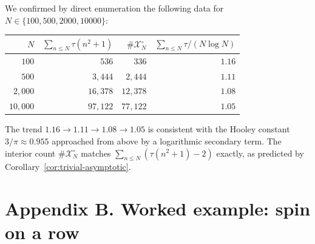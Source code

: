 \documentclass[11pt]{article}
\theoremstyle{definition}
\begin{document}
We confirmed by direct enumeration the following data for $N\in\{100,
500,2000,10000\}$:

\medskip

\begin{center}
\begin{tabular}{r|rrr}
$N$ & $\sum_{n\le N}\tau(n^{2}+1)$ & $\#\mathcal{X}_{N}^{\circ}$ &
$\sum_{n\le N}\tau/(N\log N)$\\\hline
$100$ & $536$ & $336$ & $1.16$\\
$500$ & $3{,}444$ & $2{,}444$ & $1.11$\\
$2{,}000$ & $16{,}378$ & $12{,}378$ & $1.08$\\
$10{,}000$ & $97{,}122$ & $77{,}122$ & $1.05$
\end{tabular}
\end{center}

\medskip

The trend $1.16\to 1.11\to 1.08\to 1.05$ is consistent with the Hooley
constant $3/\pi\approx 0.955$ approached from above by a logarithmic
secondary term. The interior count $\#\mathcal{X}_{N}^{\circ}$ matches
$\sum_{n\le N}(\tau(n^{2}+1)-2)$ exactly, as predicted by
Corollary~\ref{cor:trivial-asymptotic}.

\section*{Appendix B. Worked example: spin on a row}
\end{document}
